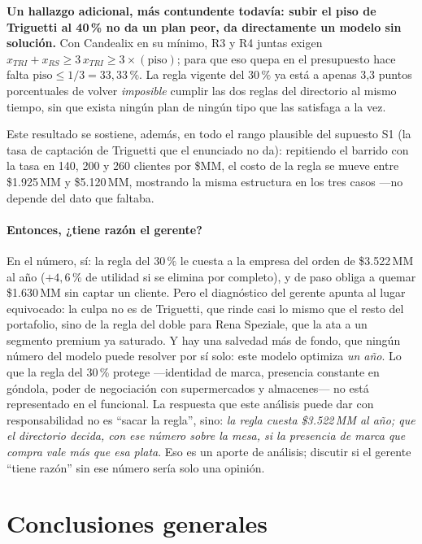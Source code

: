 \documentclass[10pt,a4paper]{article}
\begin{document}
\textbf{Un hallazgo adicional, más contundente todavía: subir el piso de
Triguetti al 40\,\% no da un plan peor, da directamente un modelo sin
solución.} Con Candealix en su mínimo, R3 y R4 juntas exigen
$x_{TRI}+x_{RS}\geq 3\,x_{TRI}\geq 3\times(\text{piso})$; para que eso quepa
en el presupuesto hace falta $\text{piso}\leq 1/3=33{,}33\,\%$. La regla
vigente del $30\,\%$ ya está a apenas 3,3 puntos porcentuales de volver
\emph{imposible} cumplir las dos reglas del directorio al mismo tiempo, sin
que exista ningún plan de ningún tipo que las satisfaga a la vez.

Este resultado se sostiene, además, en todo el rango plausible del supuesto
S1 (la tasa de captación de Triguetti que el enunciado no da): repitiendo el
barrido con la tasa en 140, 200 y 260 clientes por \$MM, el costo de la regla
se mueve entre \$1.925\,MM y \$5.120\,MM, mostrando la misma estructura en
los tres casos —no depende del dato que faltaba.

\paragraph{Entonces, ¿tiene razón el gerente?} En el número, sí: la regla del
$30\,\%$ le cuesta a la empresa del orden de \$3.522\,MM al año
($+4{,}6\,\%$ de utilidad si se elimina por completo), y de paso obliga a
quemar \$1.630\,MM sin captar un cliente. Pero el diagnóstico del gerente
apunta al lugar equivocado: la culpa no es de Triguetti, que rinde casi lo
mismo que el resto del portafolio, sino de la regla del doble para Rena
Speziale, que la ata a un segmento premium ya saturado. Y hay una salvedad
más de fondo, que ningún número del modelo puede resolver por sí solo: este
modelo optimiza \emph{un año}. Lo que la regla del 30\,\% protege —identidad
de marca, presencia constante en góndola, poder de negociación con
supermercados y almacenes— no está representado en el funcional. La
respuesta que este análisis puede dar con responsabilidad no es ``sacar la
regla'', sino: \emph{la regla cuesta \$3.522\,MM al año; que el directorio
decida, con ese número sobre la mesa, si la presencia de marca que compra vale
más que esa plata}. Eso es un aporte de análisis; discutir si el gerente
``tiene razón'' sin ese número sería solo una opinión.

\section{Conclusiones generales}
\end{document}
